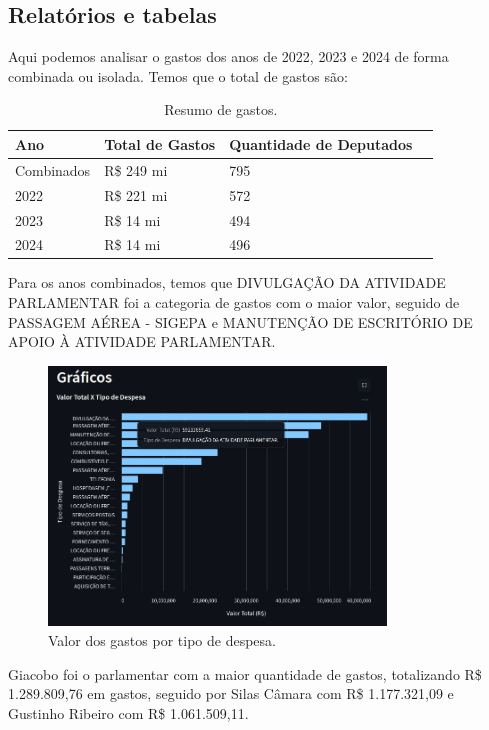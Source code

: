 \documentclass[12pt, a4paper]{article}
\begin{document}
\subsection{Relatórios e tabelas}

Aqui podemos analisar o gastos dos anos de 2022, 2023 e 2024 de forma combinada ou isolada. Temos que o total de gastos são:

\begin{table}[htbp]
	\centering
	\begin{tabular}{llll}
		\toprule
		Ano & Total de Gastos & Quantidade de Deputados \\
		\midrule
		Combinados & R\$ 249 mi & 795 \\
		2022 & R\$ 221 mi & 572 \\
		2023 & R\$ 14 mi & 494 \\
		2024 & R\$ 14 mi & 496 \\
		\bottomrule
	\end{tabular}
	\caption{Resumo de gastos.}
	\label{tab:minhatabela1}
\end{table}

Para os anos combinados, temos que DIVULGAÇÃO DA ATIVIDADE PARLAMENTAR foi a categoria de gastos com o maior valor, seguido de PASSAGEM AÉREA - SIGEPA e MANUTENÇÃO DE ESCRITÓRIO DE APOIO À ATIVIDADE PARLAMENTAR.

\begin{figure}[!htbp]
	\centering
	\includegraphics[width=0.8\textwidth]{assets/2_plot2.png}
	\caption{Valor dos gastos por tipo de despesa.}
	\label{fig:criacao_postgresql}
\end{figure}
\newpage

Giacobo foi o parlamentar com a maior quantidade de gastos, totalizando R\$ 1.289.809,76 em gastos, seguido por Silas Câmara com R\$ 1.177.321,09 e Gustinho Ribeiro com R\$ 1.061.509,11.
\end{document}
